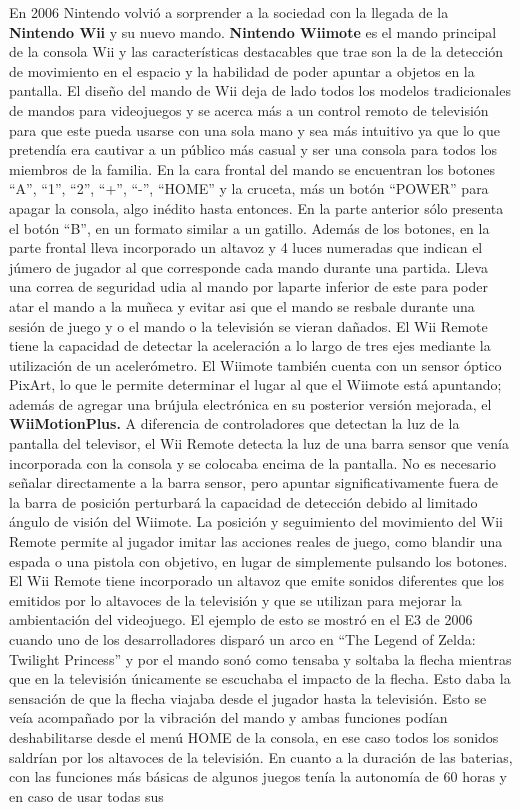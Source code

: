 En 2006 Nintendo  volvi\'o a sorprender a la sociedad con la llegada de la \textbf{Nintendo Wii} y su nuevo mando. \textbf{Nintendo Wiimote} es el mando principal de la consola Wii y las caracter\'isticas destacables que trae son la de la detecci\'on de movimiento en el espacio y la habilidad de poder apuntar a objetos en la pantalla. El dise\~no del mando de Wii deja de lado todos los modelos tradicionales de mandos para videojuegos y se acerca m\'as a un control remoto de televisi\'on para que este pueda usarse con una sola mano y sea m\'as intuitivo ya que lo que pretend\'ia era cautivar a un p\'ublico m\'as casual y ser una consola para todos los miembros de la familia. En la cara frontal del mando se encuentran los botones ``A'', ``1'', ``2'', ``+'', ``-'', ``HOME'' y la cruceta, m\'as un bot\'on ``POWER'' para apagar la consola, algo in\'edito hasta entonces. En la parte anterior s\'olo presenta el bot\'on ``B'', en un formato similar a un gatillo. Adem\'as de los botones, en la parte frontal lleva incorporado un altavoz y 4 luces numeradas que indican el j\'umero de jugador al que corresponde cada mando durante una partida. Lleva una correa de seguridad udia al mando por laparte inferior de este para poder atar el mando a la mu\~neca y evitar asi que el mando se resbale durante una sesi\'on de juego y o el mando o la televisi\'on se vieran da\~nados. El Wii Remote tiene la capacidad de detectar la aceleraci\'on a lo largo de tres ejes mediante la utilizaci\'on de un aceler\'ometro. El Wiimote tambi\'en cuenta con un sensor \'optico PixArt, lo que le permite determinar el lugar al que el Wiimote est\'a apuntando; adem\'as de agregar una br\'ujula electr\'onica en su posterior versi\'on mejorada, el \textbf{WiiMotionPlus.} A diferencia de controladores que detectan la luz de la pantalla del televisor, el Wii Remote detecta la luz de una barra sensor que ven\'ia incorporada con la consola y se colocaba encima de la pantalla. No es necesario se\~nalar directamente a la barra sensor, pero apuntar significativamente fuera de la barra de posici\'on perturbar\'a la capacidad de detecci\'on debido al limitado \'angulo de visi\'on del Wiimote. La posici\'on y seguimiento del movimiento del Wii Remote permite al jugador imitar las acciones reales de juego, como blandir una espada o una pistola con objetivo, en lugar de simplemente pulsando los botones. El Wii Remote tiene incorporado un altavoz que emite sonidos diferentes que los emitidos por lo altavoces de la televisi\'on y que se utilizan para mejorar la ambientaci\'on del videojuego. El ejemplo de esto se mostr\'o en el E3 de 2006 cuando uno de los desarrolladores dispar\'o un arco en ``The Legend of Zelda: Twilight Princess'' y por el mando son\'o como tensaba y soltaba la flecha mientras que en la televisi\'on \'unicamente se escuchaba el impacto de la flecha. Esto daba la sensaci\'on de que la flecha viajaba desde el jugador hasta la televisi\'on. Esto se ve\'ia acompa\~nado por la vibraci\'on del mando y ambas funciones pod\'ian deshabilitarse desde el men\'u HOME de la consola, en ese caso todos los sonidos saldr\'ian por los altavoces de la televisi\'on. En cuanto a la duraci\'on de las baterias, con las funciones m\'as b\'asicas de algunos juegos ten\'ia la autonom\'ia de 60 horas y en caso de usar todas sus 